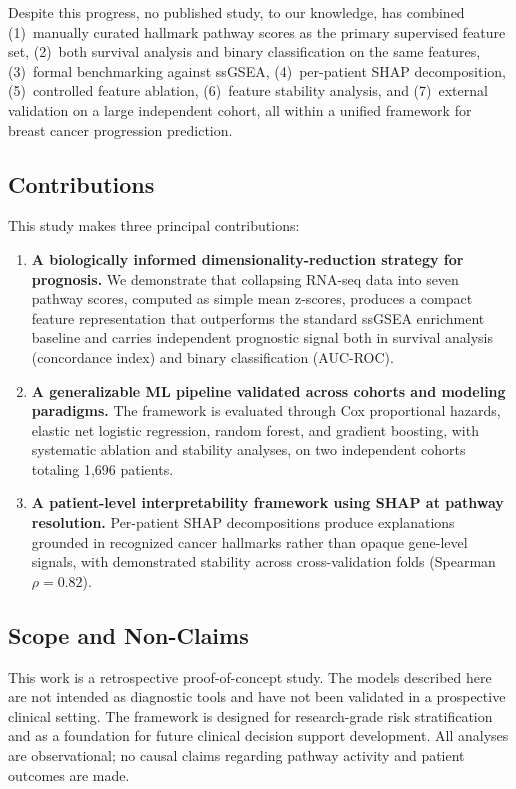 \documentclass[11pt]{article}
\begin{document}
Despite this progress, no published study, to our knowledge, has combined (1)~manually curated hallmark pathway scores as the primary supervised feature set, (2)~both survival analysis and binary classification on the same features, (3)~formal benchmarking against ssGSEA, (4)~per-patient SHAP decomposition, (5)~controlled feature ablation, (6)~feature stability analysis, and (7)~external validation on a large independent cohort, all within a unified framework for breast cancer progression prediction.

\subsection{Contributions}

This study makes three principal contributions:

\begin{enumerate}
    \item \textbf{A biologically informed dimensionality-reduction strategy for prognosis.} We demonstrate that collapsing RNA-seq data into seven pathway scores, computed as simple mean z-scores, produces a compact feature representation that outperforms the standard ssGSEA enrichment baseline and carries independent prognostic signal both in survival analysis (concordance index) and binary classification (AUC-ROC).
    \item \textbf{A generalizable ML pipeline validated across cohorts and modeling paradigms.} The framework is evaluated through Cox proportional hazards, elastic net logistic regression, random forest, and gradient boosting, with systematic ablation and stability analyses, on two independent cohorts totaling 1,696 patients.
    \item \textbf{A patient-level interpretability framework using SHAP at pathway resolution.} Per-patient SHAP decompositions produce explanations grounded in recognized cancer hallmarks rather than opaque gene-level signals, with demonstrated stability across cross-validation folds (Spearman $\rho = 0.82$).
\end{enumerate}

\subsection{Scope and Non-Claims}

This work is a retrospective proof-of-concept study. The models described here are not intended as diagnostic tools and have not been validated in a prospective clinical setting. The framework is designed for research-grade risk stratification and as a foundation for future clinical decision support development. All analyses are observational; no causal claims regarding pathway activity and patient outcomes are made.
\end{document}
